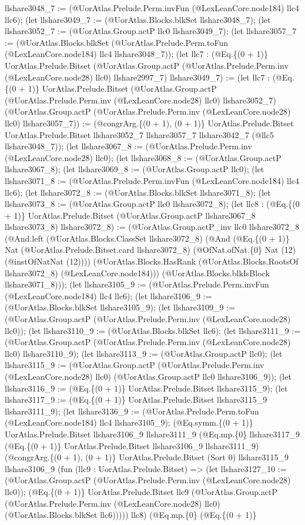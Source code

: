 \documentclass[11pt]{article}
\begin{document}
llshare3048\_7 := (@UorAtlas.Prelude.Perm.invFun (@LexLeanCore.node184) llc4 llc6); (let llshare3049\_7 := (@UorAtlas.Blocks.blkSet llshare3048\_7); (let llshare3052\_7 := (@UorAtlas.Group.actP llc0 llshare3049\_7); (let llshare3057\_7 := (@UorAtlas.Blocks.blkSet (@UorAtlas.Prelude.Perm.toFun (@LexLeanCore.node184) llc4 llshare3048\_7)); (let llc7 : (@Eq.\{(0 + 1)\} UorAtlas.Prelude.Bitset (@UorAtlas.Group.actP (@UorAtlas.Prelude.Perm.inv (@LexLeanCore.node28) llc0) llshare2997\_7) llshare3049\_7) := (let llc7 : (@Eq.\{(0 + 1)\} UorAtlas.Prelude.Bitset (@UorAtlas.Group.actP (@UorAtlas.Prelude.Perm.inv (@LexLeanCore.node28) llc0) llshare3052\_7) (@UorAtlas.Group.actP (@UorAtlas.Prelude.Perm.inv (@LexLeanCore.node28) llc0) llshare3057\_7)) := (@congrArg.\{(0 + 1), (0 + 1)\} UorAtlas.Prelude.Bitset UorAtlas.Prelude.Bitset llshare3052\_7 llshare3057\_7 llshare3042\_7 (@llc5 llshare3048\_7)); (let llshare3067\_8 := (@UorAtlas.Prelude.Perm.inv (@LexLeanCore.node28) llc0); (let llshare3068\_8 := (@UorAtlas.Group.actP llshare3067\_8); (let llshare3069\_8 := (@UorAtlas.Group.actP llc0); (let llshare3071\_8 := (@UorAtlas.Prelude.Perm.invFun (@LexLeanCore.node184) llc4 llc6); (let llshare3072\_8 := (@UorAtlas.Blocks.blkSet llshare3071\_8); (let llshare3073\_8 := (@UorAtlas.Group.actP llc0 llshare3072\_8); (let llc8 : (@Eq.\{(0 + 1)\} UorAtlas.Prelude.Bitset (@UorAtlas.Group.actP llshare3067\_8 llshare3073\_8) llshare3072\_8) := (@UorAtlas.Group.actP\_inv llc0 llshare3072\_8 (@And.left (@UorAtlas.Blocks.ClassSet llshare3072\_8) (@And (@Eq.\{(0 + 1)\} Nat (@UorAtlas.Prelude.Bitset.card llshare3072\_8) (@OfNat.ofNat.\{0\} Nat (12) (@instOfNatNat (12)))) (@UorAtlas.Blocks.HasRank (@UorAtlas.Blocks.RootsOf llshare3072\_8) (@LexLeanCore.node184))) (@UorAtlas.Blocks.blkIsBlock llshare3071\_8))); (let llshare3105\_9 := (@UorAtlas.Prelude.Perm.invFun (@LexLeanCore.node184) llc4 llc6); (let llshare3106\_9 := (@UorAtlas.Blocks.blkSet llshare3105\_9); (let llshare3109\_9 := (@UorAtlas.Group.actP (@UorAtlas.Prelude.Perm.inv (@LexLeanCore.node28) llc0)); (let llshare3110\_9 := (@UorAtlas.Blocks.blkSet llc6); (let llshare3111\_9 := (@UorAtlas.Group.actP (@UorAtlas.Prelude.Perm.inv (@LexLeanCore.node28) llc0) llshare3110\_9); (let llshare3113\_9 := (@UorAtlas.Group.actP llc0); (let llshare3115\_9 := (@UorAtlas.Group.actP (@UorAtlas.Prelude.Perm.inv (@LexLeanCore.node28) llc0) (@UorAtlas.Group.actP llc0 llshare3106\_9)); (let llshare3116\_9 := (@Eq.\{(0 + 1)\} UorAtlas.Prelude.Bitset llshare3115\_9); (let llshare3117\_9 := (@Eq.\{(0 + 1)\} UorAtlas.Prelude.Bitset llshare3115\_9 llshare3111\_9); (let llshare3136\_9 := (@UorAtlas.Prelude.Perm.toFun (@LexLeanCore.node184) llc4 llshare3105\_9); (@Eq.symm.\{(0 + 1)\} UorAtlas.Prelude.Bitset llshare3106\_9 llshare3111\_9 (@Eq.mp.\{0\} llshare3117\_9 (@Eq.\{(0 + 1)\} UorAtlas.Prelude.Bitset llshare3106\_9 llshare3111\_9) (@congrArg.\{(0 + 1), (0 + 1)\} UorAtlas.Prelude.Bitset (Sort 0) llshare3115\_9 llshare3106\_9 (fun (llc9 : UorAtlas.Prelude.Bitset) => (let llshare3127\_10 := (@UorAtlas.Group.actP (@UorAtlas.Prelude.Perm.inv (@LexLeanCore.node28) llc0)); (@Eq.\{(0 + 1)\} UorAtlas.Prelude.Bitset llc9 (@UorAtlas.Group.actP (@UorAtlas.Prelude.Perm.inv (@LexLeanCore.node28) llc0) (@UorAtlas.Blocks.blkSet llc6))))) llc8) (@Eq.mp.\{0\} (@Eq.\{(0 + 1)\} 
\end{document}
